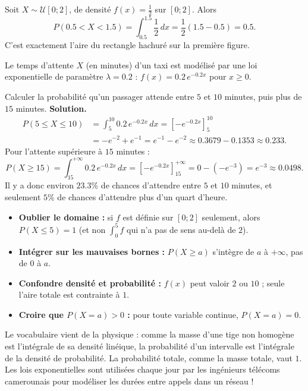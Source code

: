 \documentclass[11pt]{article}
\begin{document}
\begin{exemplebox}
Soit $X \sim \mathcal{U}[0 ; 2]$, de densité $f(x) = \tfrac{1}{2}$ sur $[0 ; 2]$. Alors
\[ P(0.5 < X < 1.5) = \int_{0.5}^{1.5} \frac{1}{2}\,dx = \frac{1}{2}(1.5 - 0.5) = 0.5. \]
C'est exactement l'aire du rectangle hachuré sur la première figure.
\end{exemplebox}

\begin{exoresolu}
Le temps d'attente $X$ (en minutes) d'un taxi est modélisé par une loi exponentielle de paramètre $\lambda = 0.2$ : $f(x) = 0.2\,e^{-0.2x}$ pour $x \geq 0$.

Calculer la probabilité qu'un passager attende entre $5$ et $10$ minutes, puis plus de $15$ minutes.
\tcblower
\textbf{Solution.}
\begin{align*}
P(5 \leq X \leq 10) &= \int_5^{10} 0.2\,e^{-0.2x}\,dx = \left[ -e^{-0.2x} \right]_5^{10} \\
&= -e^{-2} + e^{-1} = e^{-1} - e^{-2} \approx 0.3679 - 0.1353 \approx 0.233.
\end{align*}
Pour l'attente supérieure à $15$ minutes :
\[ P(X \geq 15) = \int_{15}^{+\infty} 0.2\,e^{-0.2x}\,dx = \left[ -e^{-0.2x} \right]_{15}^{+\infty} = 0 - (-e^{-3}) = e^{-3} \approx 0.0498. \]
Il y a donc environ $23.3\%$ de chances d'attendre entre $5$ et $10$ minutes, et seulement $5\%$ de chances d'attendre plus d'un quart d'heure.
\end{exoresolu}

\begin{attention}
\begin{itemize}
\item \textbf{Oublier le domaine :} si $f$ est définie sur $[0 ; 2]$ seulement, alors $P(X \leq 5) = 1$ (et non $\int_0^5 f$ qui n'a pas de sens au-delà de $2$).
\item \textbf{Intégrer sur les mauvaises bornes :} $P(X \geq a)$ s'intègre de $a$ à $+\infty$, pas de $0$ à $a$.
\item \textbf{Confondre densité et probabilité :} $f(x)$ peut valoir $2$ ou $10$ ; seule l'aire totale est contrainte à $1$.
\item \textbf{Croire que $P(X = a) > 0$ :} pour toute variable continue, $P(X = a) = 0$.
\end{itemize}
\end{attention}

\begin{savaistu}
Le vocabulaire vient de la physique : comme la masse d'une tige non homogène est l'intégrale de sa densité linéique, la probabilité d'un intervalle est l'intégrale de la densité de probabilité. La probabilité totale, comme la masse totale, vaut $1$. Les lois exponentielles sont utilisées chaque jour par les ingénieurs télécoms camerounais pour modéliser les durées entre appels dans un réseau !
\end{savaistu}
\end{document}
